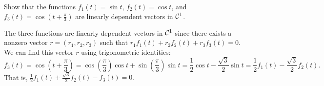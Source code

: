 \documentclass{ximera}
\begin{document}
\begin{exercise} \label{c5.4.6}
Show that the functions $f_1(t) = \sin t$, $f_2(t)=\cos t$, and
$f_3(t)=\cos\left(t+\frac{\pi}{3}\right)$ are linearly dependent
vectors in ${\cal C}^1$.

\begin{solution}

The three functions are linearly dependent vectors in ${\cal C}^1$ since
there exists a nonzero vector $r = (r_1,r_2,r_3)$ such that
$r_1f_1(t) + r_2f_2(t) + r_3f_3(t) = 0$.  We can find this vector $r$
using trigonometric identities:
\[ f_3(t) = \cos\left(t + \frac{\pi}{3}\right) =
\cos\left(\frac{\pi}{3}\right)\cos t + \sin\left(\frac{\pi}{3}\right)\sin t
= \frac{1}{2}\cos t - \frac{\sqrt{3}}{2}\sin t =
\frac{1}{2}f_1(t) - \frac{\sqrt{3}}{2}f_2(t). \]
That is, $\frac{1}{2}f_1(t) + \frac{\sqrt{3}}{2}f_2(t) - f_3(t) = 0$.

\end{solution}
\end{exercise}
\end{document}
